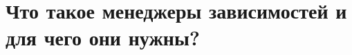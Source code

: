 \documentclass[10pt]{book}
\begin{document}
\section{Что такое менеджеры зависимостей и для чего они нужны?}
\end{document}
